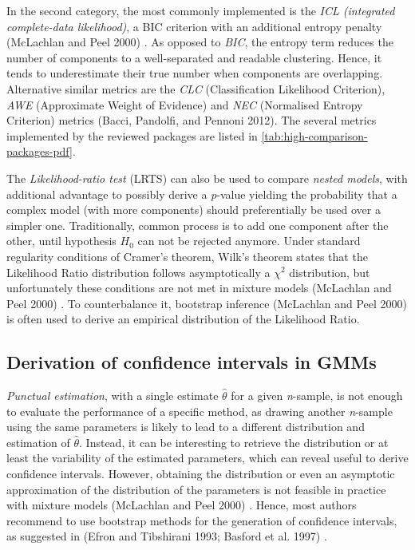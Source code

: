 In the second category, the most commonly implemented is the \emph{ICL
(integrated complete-data likelihood)}, a BIC criterion with an
additional entropy penalty (McLachlan and Peel 2000) . As opposed to \emph{BIC},
the entropy term reduces the number of components to a well-separated
and readable clustering. Hence, it tends to underestimate their true
number when components are overlapping. Alternative similar metrics are
the \emph{CLC} (Classification Likelihood Criterion), \emph{AWE} (Approximate
Weight of Evidence) and \emph{NEC} (Normalised Entropy Criterion) metrics
(Bacci, Pandolfi, and Pennoni 2012). The several metrics implemented by the reviewed
packages are listed in
\ref{tab:high-comparison-packages-pdf}.

The \emph{Likelihood-ratio test} (LRTS) can also be used to compare \emph{nested
models}, with additional advantage to possibly derive a \emph{p}-value
yielding the probability that a complex model (with more components)
should preferentially be used over a simpler one. Traditionally, common
process is to add one component after the other, until hypothesis \(H_0\)
can not be rejected anymore. Under standard regularity conditions of
Cramer's theorem, Wilk's theorem states that the Likelihood Ratio
distribution follows asymptotically a \(\chi^2\) distribution, but
unfortunately these conditions are not met in mixture models
(McLachlan and Peel 2000) . To counterbalance it, bootstrap inference
(McLachlan and Peel 2000) is often used to derive an empirical distribution of
the Likelihood Ratio.

\hypertarget{derivation-of-confidence-intervals-in-gmms}{%
\subsection{Derivation of confidence intervals in GMMs}\label{derivation-of-confidence-intervals-in-gmms}}

\emph{Punctual estimation}, with a single estimate \(\hat{\theta}\) for a given
\emph{n}-sample, is not enough to evaluate the performance of a specific
method, as drawing another \emph{n}-sample using the same parameters is
likely to lead to a different distribution and estimation of
\(\hat{\theta}\). Instead, it can be interesting to retrieve the
distribution or at least the variability of the estimated parameters,
which can reveal useful to derive confidence intervals. However,
obtaining the distribution or even an asymptotic approximation of the
distribution of the parameters is not feasible in practice with mixture
models (McLachlan and Peel 2000) . Hence, most authors recommend to use
bootstrap methods for the generation of confidence intervals, as
suggested in (Efron and Tibshirani 1993; Basford et al. 1997) .

